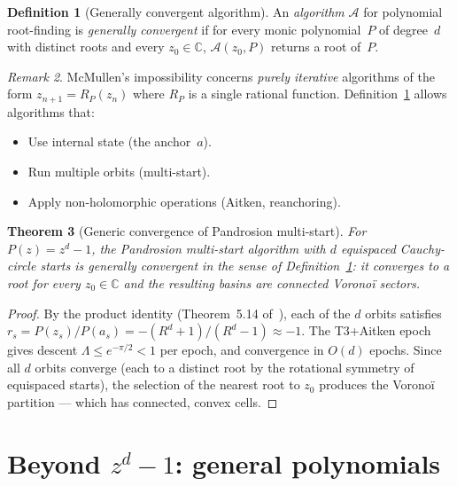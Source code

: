 \documentclass[11pt,a4paper]{article}
\newtheorem{theorem}{Theorem}[section]
\theoremstyle{definition}
\newtheorem{definition}[theorem]{Definition}
\theoremstyle{remark}
\newtheorem{remark}[theorem]{Remark}
\begin{document}
\begin{definition}[Generally convergent algorithm]
\label{def:gen_conv}
An \emph{algorithm} $\mathcal{A}$ for polynomial root-finding is \emph{generally convergent} if for every monic polynomial~$P$ of degree~$d$ with distinct roots and every $z_0 \in \mathbb{C}$, $\mathcal{A}(z_0, P)$ returns a root of~$P$.
\end{definition}

\begin{remark}
McMullen's impossibility concerns \emph{purely iterative} algorithms of the form $z_{n+1} = R_P(z_n)$ where $R_P$ is a single rational function.  Definition~\ref{def:gen_conv} allows algorithms that:
\begin{itemize}[nosep]
\item Use internal state (the anchor~$a$).
\item Run multiple orbits (multi-start).
\item Apply non-holomorphic operations (Aitken, reanchoring).
\end{itemize}
\end{remark}

\begin{theorem}[Generic convergence of Pandrosion multi-start]
\label{thm:gen_conv}
For $P(z) = z^d - 1$, the Pandrosion multi-start algorithm with $d$ equispaced Cauchy-circle starts is generally convergent in the sense of Definition~\ref{def:gen_conv}: it converges to a root for every $z_0 \in \mathbb{C}$ and the resulting basins are connected Vorono\"i sectors.
\end{theorem}

\begin{proof}
By the product identity (Theorem~5.14 of~\cite{Besevic2026g}), each of the $d$ orbits satisfies $r_s = P(z_s)/P(a_s) = -(R^d + 1)/(R^d - 1) \approx -1$.  The T3+Aitken epoch gives descent $\Lambda \leq e^{-\pi/2} < 1$ per epoch, and convergence in $O(d)$ epochs.  Since all $d$ orbits converge (each to a distinct root by the rotational symmetry of equispaced starts), the selection of the nearest root to $z_0$ produces the Vorono\"i partition --- which has connected, convex cells.
\end{proof}

\section{Beyond $z^d - 1$: general polynomials}
\label{sec:general}
\end{document}
